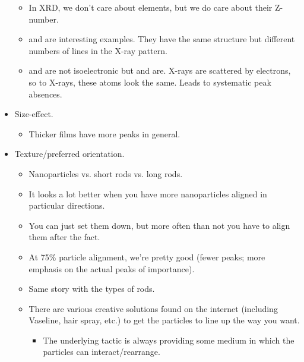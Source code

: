 \documentclass[../notes.tex]{subfiles}
\begin{document}
\begin{itemize}
\begin{itemize}
        \item In XRD, we don't care about elements, but we do care about their Z-number.
        \item {} and  are interesting examples. They have the same structure but different numbers of lines in the X-ray pattern.
        \item {} and  are not isoelectronic but  and  are. X-rays are scattered by electrons, so to X-rays, these atoms look the same. Leads to systematic peak absences.
    \end{itemize}
    \item Size-effect.
    \begin{itemize}
        \item Thicker films have more peaks in general.
    \end{itemize}
    \item Texture/preferred orientation.
    \begin{itemize}
        \item Nanoparticles vs. short rods vs. long rods.
        \item It looks a lot better when you have more nanoparticles aligned in particular directions.
        \item You can just set them down, but more often than not you have to align them after the fact.
        \item At 75\% particle alignment, we're pretty good (fewer peaks; more emphasis on the actual peaks of importance).
        \item Same story with the types of rods.
        \item There are various creative solutions found on the internet (including Vaseline, hair spray, etc.) to get the particles to line up the way you want.
        \begin{itemize}
            \item The underlying tactic is always providing some medium in which the particles can interact/rearrange.
        \end{itemize}
    \end{itemize}
\end{itemize}
\end{document}
